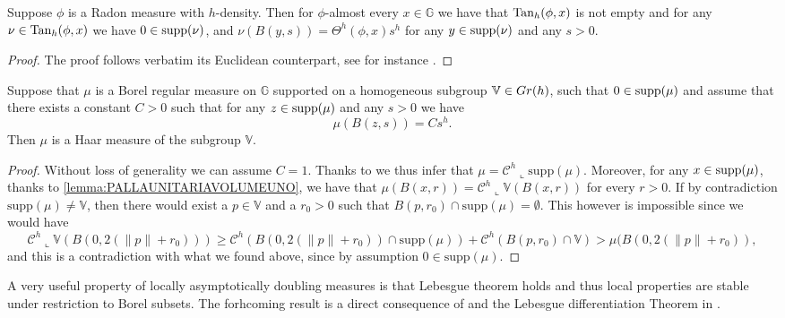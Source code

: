 \documentclass[10pt, a4paper,
oneside, headinclude,footinclude]{scrartcl}
\begin{document}
\begin{proposizione}\label{regularity:density}
Suppose $\phi$ is a Radon measure with $h$-density. Then for $\phi$-almost every $x\in\mathbb{G}$ we have that $\mathrm{Tan}_h(\phi,x)$ is not empty and for any $\nu\in \mathrm{Tan}_h(\phi,x)$ we have $0\in\operatorname*{supp}(\nu)$, and
$\nu(B(y,s))=\Theta^h(\phi,x)s^h$
for any $y\in \operatorname*{supp}(\nu)$ and any $s>0$. 
\end{proposizione}

\begin{proof}
The proof follows verbatim its Euclidean counterpart, see for instance \cite[Proposition 3.4]{DeLellis2008RectifiableMeasures}.
\end{proof}

\begin{proposizione}\label{regularity:density2}
Suppose that $\mu$ is a Borel regular measure on $\mathbb{G}$ supported on a homogeneous subgroup $\mathbb{V}\in Gr(h)$, such that $0\in\operatorname*{supp}(\mu)$ and assume that there exists a constant $C>0$ such that for any $z\in \operatorname*{supp}(\mu)$ and any $s>0$ we have
$$\mu(B(z,s))=Cs^h.$$
Then $\mu$ is a Haar measure of the subgroup $\mathbb V$.
\end{proposizione}

\begin{proof}
Without loss of generality we can assume $C=1$. Thanks to \cite[Theorem 3.1]{FSSC15} we thus infer that $\mu=\mathcal{C}^h\llcorner \text{supp}(\mu)$.
Moreover, for any $x\in \operatorname*{supp}(\mu)$, thanks to \cref{lemma:PALLAUNITARIAVOLUMEUNO},
we have that $\mu(B(x,r))=\mathcal{C}^h\llcorner \mathbb V (B(x,r))$ for every $r>0$. If by contradiction $\text{supp}(\mu)\neq \mathbb V$, then there would exist a $p\in \mathbb V$ and a $r_0>0$ such that $B(p,r_0)\cap \text{supp} (\mu)=\emptyset$. This however is impossible since we would have
$$\mathcal{C}^h\llcorner \mathbb V(B(0,2(\|p\|+r_0)))\geq \mathcal{C}^h(B(0,2(\|p\|+r_0))\cap \text{supp}(\mu))+\mathcal{C}^h(B(p,r_0)\cap \mathbb V)>\mu(B(0,2(\|p\|+r_0)),$$
and this is a contradiction with what we found above, since by assumption $0\in\text{supp}(\mu)$.
\end{proof}




A very useful property of locally asymptotically doubling measures is that Lebesgue theorem holds and thus local properties are stable under restriction to Borel subsets. The forhcoming result is a direct consequence of \cite[Theorem 3.4.3]{HeinonenKoskelaShanmugalingam} and the Lebesgue differentiation Theorem in \cite[page 77]{HeinonenKoskelaShanmugalingam}.
\end{document}
